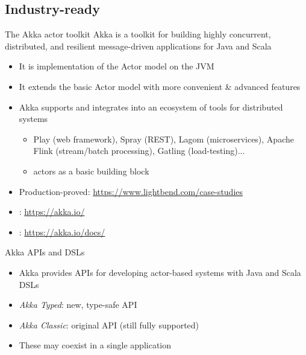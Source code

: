 \documentclass[presentation, 9pt]{beamer}\mode<presentation>{\usetheme{AMSBolognaFC}}
\begin{document}
\subsection{Industry-ready}
\begin{frame}[c]{The Akka actor toolkit}
Akka is a toolkit for building highly concurrent, distributed, and resilient
message-driven applications for Java and Scala
\begin{itemize}
	\item It is  implementation of the Actor model on the JVM
	\item It extends the basic Actor model with more convenient \& advanced features
	\item Akka supports and integrates into an ecosystem of tools for distributed systems
 \begin{itemize}
		\item Play (web framework), Spray (REST), Lagom (microservices), Apache Flink (stream/batch
		processing), Gatling (load-testing)...
		\item actors as a basic building block
 \end{itemize}
 \item Production-proved: \url{https://www.lightbend.com/case-studies}
 \item {}: \url{https://akka.io/}
 \item {}: \url{https://akka.io/docs/}
\end{itemize}
\begin{alertblock}{Akka APIs and DSLs \href{https://doc.akka.io/docs/akka/current/typed/from-classic.html}{\faLink}}
	\begin{itemize}
		\item Akka provides APIs for developing actor-based systems with Java and Scala DSLs
		\item \emph{Akka Typed}: new, type-safe API
		\item \emph{Akka Classic}: original API (still fully supported)
		\item These may coexist in a single application
	\end{itemize}
\end{alertblock}
\end{frame}
\end{document}

